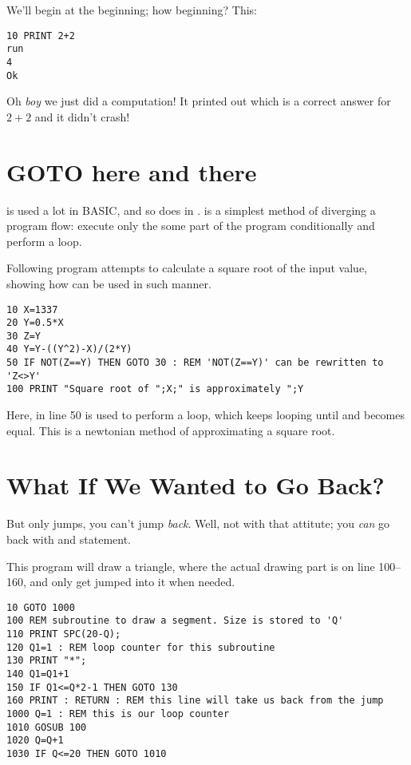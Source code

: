 \quad
{}

We'll begin at the beginning; how beginning? This:

\begin{lstlisting}
10 PRINT 2+2
run
4
Ok
\end{lstlisting}

Oh \emph{boy} we just did a computation! It printed out  which is a correct answer for $2+2$ and it didn't crash!

\section[GOTO]{GOTO here and there}

 is used a lot in BASIC, and so does in \tbas.  is a simplest method of diverging a program flow: execute only the some part of the program conditionally and perform a loop.

Following program attempts to calculate a square root of the input value,  showing how  can be used in such manner.

\begin{lstlisting}
10 X=1337
20 Y=0.5*X
30 Z=Y
40 Y=Y-((Y^2)-X)/(2*Y)
50 IF NOT(Z==Y) THEN GOTO 30 : REM 'NOT(Z==Y)' can be rewritten to 'Z<>Y' 
100 PRINT "Square root of ";X;" is approximately ";Y
\end{lstlisting}

Here,  in line 50 is used to perform a loop, which keeps looping until  and  becomes equal. This is a newtonian method of approximating a square root. 

\section[Subroutine with GOSUB]{What If We Wanted to Go Back?}

But  only jumps, you can't jump \emph{back}. Well, not with that attitute; you \emph{can} go back with  and  statement.

This program will draw a triangle, where the actual drawing part is on line 100--160, and only get jumped into it when needed.

\begin{lstlisting}
10 GOTO 1000
100 REM subroutine to draw a segment. Size is stored to 'Q'
110 PRINT SPC(20-Q);
120 Q1=1 : REM loop counter for this subroutine
130 PRINT "*";
140 Q1=Q1+1
150 IF Q1<=Q*2-1 THEN GOTO 130
160 PRINT : RETURN : REM this line will take us back from the jump
1000 Q=1 : REM this is our loop counter
1010 GOSUB 100
1020 Q=Q+1
1030 IF Q<=20 THEN GOTO 1010
\end{lstlisting}


